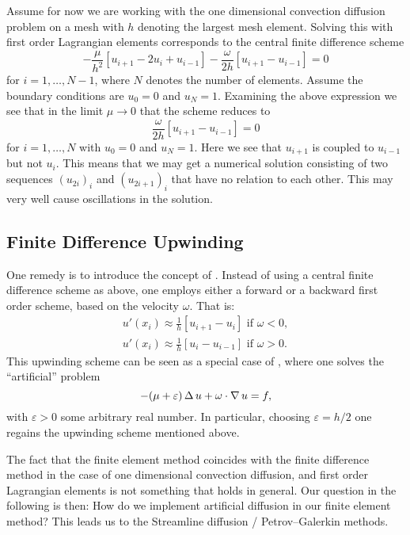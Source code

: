 Assume for now we are working with the one dimensional convection diffusion
problem on a mesh with \( h \) denoting the largest mesh element. Solving this
with first order Lagrangian elements corresponds to the central finite
difference scheme
\begin{equation}
    -\frac{\mu}{h^2} [u_{i+1} - 2u_i + u_{i-1}] - \frac{\omega}{2h} [u_{i+1} - u_{i-1}] = 0
\end{equation}
for \( i = 1, \ldots, N-1 \), where \( N \) denotes the number of elements.
Assume the boundary conditions are \( u_0 = 0 \) and \( u_N = 1\). Examining
the above expression we see that in the limit \( \mu \to 0 \) that the scheme
reduces to
\begin{equation}
    \frac{\omega}{2h}[u_{i+1} - u_{i - 1}] = 0
\end{equation}
for \(i = 1, \dots, N\) with \(u_0 = 0\) and \(u_N = 1 \). Here we see that \(
u_{i+1} \) is coupled to \( u_{i-1} \) but not \( u_i \). This means that we
may get a numerical solution consisting of two sequences \((u_{2i})_i\) and
\((u_{2i+1})_i\) that have no relation to each other. This may very well cause
oscillations in the solution.

\subsection{Finite Difference Upwinding}

One remedy is to introduce the concept of . Instead of using a
central finite difference scheme as above, one employs either a forward or a backward
first order scheme, based on the velocity \( \omega\). That is:
\begin{align}
    u'(x_i) \approx \frac{1}{h}[u_{i+1} - u_i] \text{ if } \omega < 0, \\
    u'(x_i) \approx \frac{1}{h}[u_{i} - u_{i-1}] \text{ if } \omega > 0.
\end{align}
This upwinding scheme can be seen as a special case of , where one solves the ``artificial'' problem
\begin{equation}
    -(\mu + \varepsilon)\operatorname{\mathop{}\!\Delta} u + \omega \cdot \operatorname{\mathop{}\!\nabla} u = f,
\end{equation}
with \( \varepsilon > 0 \) some arbitrary real number. In particular, choosing
\( \varepsilon = h / 2 \) one regains the upwinding scheme mentioned above.

The fact that the finite element method coincides with the finite difference
method in the case of one dimensional convection diffusion, and first order
Lagrangian elements is not something that holds in general. Our question in the
following is then: How do we implement artificial diffusion in our finite
element method? This leads us to the Streamline diffusion / Petrov--Galerkin
methods.

